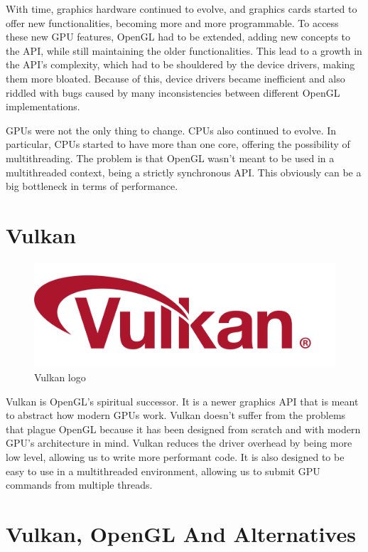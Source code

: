 With time, graphics hardware continued to evolve, and graphics cards started
to offer new functionalities, becoming more and more programmable.
To access these new GPU features, OpenGL had to be extended, adding new
concepts to the API, while still maintaining the older functionalities.
This lead to a growth in the API's complexity, which had to be shouldered by
the device drivers, making them more bloated.
Because of this, device drivers became inefficient and also riddled with bugs
caused by many inconsistencies between different OpenGL implementations.

GPUs were not the only thing to change.
CPUs also continued to evolve.
In particular, CPUs started to have more than one core, offering the possibility
of multithreading.
The problem is that OpenGL wasn't meant to be used in a multithreaded context,
being a strictly synchronous API.
This obviously can be a big bottleneck in terms of performance.

\section{Vulkan}

\begin{figure}[H]
    \centering
    \includegraphics[scale=0.10]{images/ChVulkan/VulkanLogo.png}
    \caption{Vulkan logo}
    \label{fig::VulkanLogo}
\end{figure}

Vulkan is OpenGL's spiritual successor.
It is a newer graphics API that is meant to abstract how modern GPUs work.
Vulkan doesn't suffer from the problems that plague OpenGL because it has been
designed from scratch and with modern GPU's architecture in mind.
Vulkan reduces the driver overhead by being more low level, allowing us to
write more performant code.
It is also designed to be easy to use in a multithreaded environment,
allowing us to submit GPU commands from multiple threads.

\section{Vulkan, OpenGL And Alternatives}

